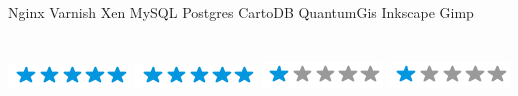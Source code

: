 \documentclass[]{friggeri-cv}
\begin{document}
\newpage
{}%
\begin{aside}
~
~
~
  \section{}
    Nginx
    Varnish
    Xen
    MySQL
    Postgres
    CartoDB
    QuantumGis
    Inkscape
    Gimp
    ~
  \section{}
    \textbf{}\includegraphics[scale=0.40]{img/5stars.png}
    \textbf{}\includegraphics[scale=0.40]{img/5stars.png}
    \textbf{}\includegraphics[scale=0.40]{img/1stars.png}
    \textbf{}\includegraphics[scale=0.40]{img/1stars.png}
    ~

\end{aside}
\end{document}
